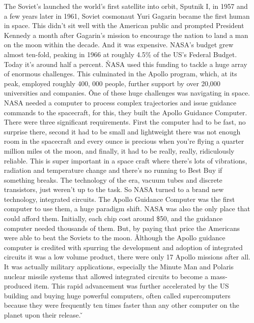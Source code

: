 The Soviet's launched the world's first satellite into orbit, Sputnik I, in 1957 and a few years later in 1961,
Soviet cosmonaut Yuri Gagarin became the first human in space. This didn't sit well with the American public and
prompted President Kennedy a month after Gagarin's mission to encourage the nation to land a man on the moon within
the decade. And it was expensive. NASA's budget grew almost ten-fold, peaking in 1966 at roughly 4.5\% of the US's
Federal Budget. Today it's around half a percent. \v

NASA used this funding to tackle a huge array of enormous challenges. This culminated in the Apollo program, which,
at its peak, employed roughly 400, 000 people, further support by over 20,000 universities and companies. \v

One of these huge challenges was navigating in space. NASA needed a computer to process complex trajectories and
issue guidance commands to the spacecraft, for this, they built the Apollo Guidance Computer. There were three
significant requirements. First the computer had to be fast, no surprise there, second it had to be small and
lightweight there was not enough room in the spacecraft and every ounce is precious when you're flying a quarter
million miles ot the moon, and finally, it had to be really, really, ridiculously reliable. This is super important
in a space craft where there's lots of vibrations, radiation and temperature change and there's no running to Best
Buy if something breaks. The technology of the era, vacuum tubes and discrete transistors, just weren't up to the
task. So NASA turned to a brand new technology, integrated circuits. The Apollo Guidance Computer was the first
computer to use them, a huge paradigm shift. NASA was also the only place that could afford them. Initially, each
chip cost around \$50, and the guidance computer needed thousands of them. But, by paying that price the Americans
were able to beat the Soviets to the moon. \v

Although the Apollo guidance computer is credited with spurring the development and adoption of integrated circuits
it was a low volume product, there were only 17 Apollo missions after all. It was actually military applications,
especially the Minute Man and Polaris nuclear missile systems that allowed integrated circuits to become a
mass-produced item. This rapid advancement was further accelerated by the US building and buying huge powerful
computers, often called supercomputers because they were frequently ten times faster than any other computer on the
planet upon their release. \v

